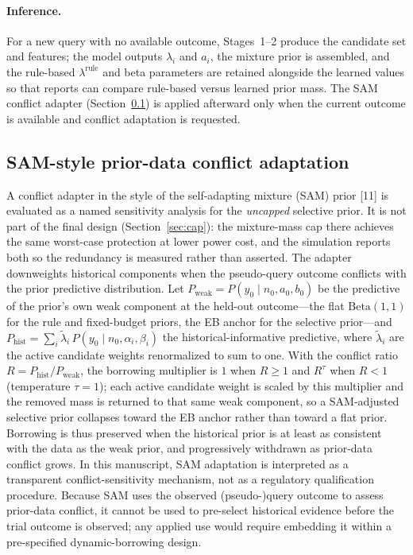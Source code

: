\documentclass[11pt]{article}
\begin{document}
\paragraph{Inference.} For a new query with no available outcome, Stages~1--2
produce the candidate set and features; the model outputs $\lambda_i$ and $a_i$,
the mixture prior is assembled, and the rule-based $\lambda^{\mathrm{rule}}$ and
beta parameters are retained alongside the learned values so that reports can
compare rule-based versus learned prior mass. The SAM conflict adapter
(Section~\ref{sec:sam}) is applied afterward only when the current outcome is available
and conflict adaptation is requested.

\subsection{SAM-style prior-data conflict adaptation}
\label{sec:sam}
A conflict adapter in the style of the self-adapting mixture (SAM)
prior [11] is evaluated as a named sensitivity analysis for the
\emph{uncapped} selective prior. It is not part of the final design
(Section~\ref{sec:cap}): the mixture-mass cap there achieves the same
worst-case protection at lower power cost, and the simulation reports both
so the redundancy is measured rather than asserted.
The adapter downweights historical components when the pseudo-query outcome
conflicts with the prior predictive distribution. Let
$P_{\mathrm{weak}} = P(y_0 \mid n_0, a_0, b_0)$ be the predictive of the
prior's own weak component at the held-out outcome---the flat
$\mathrm{Beta}(1,1)$ for the rule and fixed-budget priors, the EB anchor for
the selective prior---and
$P_{\mathrm{hist}} = \sum_i \tilde\lambda_i\,P(y_0 \mid n_0, \alpha_i, \beta_i)$
the historical-informative predictive, where $\tilde\lambda_i$ are the active
candidate weights renormalized to sum to one. With the conflict ratio
$R = P_{\mathrm{hist}}/P_{\mathrm{weak}}$, the borrowing multiplier is $1$ when
$R \ge 1$ and $R^{\tau}$ when $R < 1$ (temperature $\tau = 1$); each active
candidate weight is scaled by this multiplier and the removed mass is returned
to that same weak component, so a SAM-adjusted selective prior collapses
toward the EB anchor rather than toward a flat prior. Borrowing is thus preserved when the historical prior is
at least as consistent with the data as the weak prior, and progressively
withdrawn as prior-data conflict grows. In this manuscript, SAM adaptation is
interpreted as a transparent conflict-sensitivity mechanism, not as a regulatory
qualification procedure. Because SAM uses the observed (pseudo-)query outcome to
assess prior-data conflict, it cannot be used to pre-select historical evidence
before the trial outcome is observed; any applied use would require embedding it
within a pre-specified dynamic-borrowing design.
\end{document}
